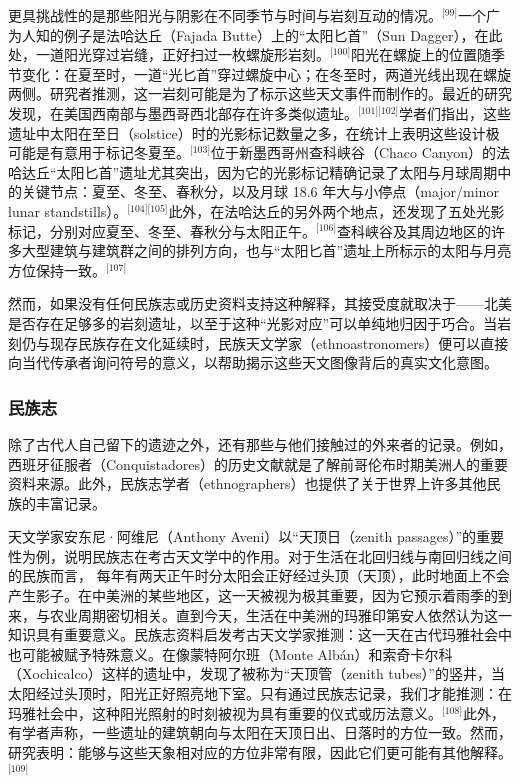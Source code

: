 更具挑战性的是那些阳光与阴影在不同季节与时间与岩刻互动的情况。\(^\text{[99]}\)一个广为人知的例子是法哈达丘（Fajada Butte）上的“太阳匕首”（Sun Dagger），在此处，一道阳光穿过岩缝，正好扫过一枚螺旋形岩刻。\(^\text{[100]}\)阳光在螺旋上的位置随季节变化：在夏至时，一道“光匕首”穿过螺旋中心；在冬至时，两道光线出现在螺旋两侧。研究者推测，这一岩刻可能是为了标示这些天文事件而制作的。最近的研究发现，在美国西南部与墨西哥西北部存在许多类似遗址。\(^\text{[101][102]}\)学者们指出，这些遗址中太阳在至日（solstice）时的光影标记数量之多，在统计上表明这些设计极可能是有意用于标记冬夏至。\(^\text{[103]}\)位于新墨西哥州查科峡谷（Chaco Canyon）的法哈达丘“太阳匕首”遗址尤其突出，因为它的光影标记精确记录了太阳与月球周期中的关键节点：夏至、冬至、春秋分，以及月球 18.6 年大与小停点（major/minor lunar standstills）。\(^\text{[104][105]}\)此外，在法哈达丘的另外两个地点，还发现了五处光影标记，分别对应夏至、冬至、春秋分与太阳正午。\(^\text{[106]}\)查科峡谷及其周边地区的许多大型建筑与建筑群之间的排列方向，也与“太阳匕首”遗址上所标示的太阳与月亮方位保持一致。\(^\text{[107]}\)

然而，如果没有任何民族志或历史资料支持这种解释，其接受度就取决于——北美是否存在足够多的岩刻遗址，以至于这种“光影对应”可以单纯地归因于巧合。当岩刻仍与现存民族存在文化延续时，民族天文学家（ethnoastronomers）便可以直接向当代传承者询问符号的意义，以帮助揭示这些天文图像背后的真实文化意图。
\subsubsection{民族志}
除了古代人自己留下的遗迹之外，还有那些与他们接触过的外来者的记录。例如，西班牙征服者（Conquistadores）的历史文献就是了解前哥伦布时期美洲人的重要资料来源。此外，民族志学者（ethnographers）也提供了关于世界上许多其他民族的丰富记录。

天文学家安东尼·阿维尼（Anthony Aveni）以“天顶日（zenith passages）”的重要性为例，说明民族志在考古天文学中的作用。对于生活在北回归线与南回归线之间的民族而言，
每年有两天正午时分太阳会正好经过头顶（天顶），此时地面上不会产生影子。在中美洲的某些地区，这一天被视为极其重要，因为它预示着雨季的到来，与农业周期密切相关。直到今天，生活在中美洲的玛雅印第安人依然认为这一知识具有重要意义。民族志资料启发考古天文学家推测：这一天在古代玛雅社会中也可能被赋予特殊意义。在像蒙特阿尔班（Monte Albán）和索奇卡尔科（Xochicalco）这样的遗址中，发现了被称为“天顶管（zenith tubes）”的竖井，当太阳经过头顶时，阳光正好照亮地下室。只有通过民族志记录，我们才能推测：在玛雅社会中，这种阳光照射的时刻被视为具有重要的仪式或历法意义。\(^\text{[108]}\)此外，有学者声称，一些遗址的建筑朝向与太阳在天顶日出、日落时的方位一致。然而，研究表明：能够与这些天象相对应的方位非常有限，因此它们更可能有其他解释。\(^\text{[109]}\)

